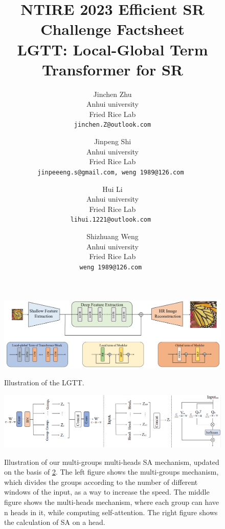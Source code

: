 \documentclass[10pt,twocolumn,letterpaper]{article}
\begin{document}
\title{NTIRE 2023 Efficient SR Challenge Factsheet \\
	LGTT: Local-Global Term Transformer for SR}

\author{Jinchen Zhu\\
Anhui university\\
Fried Rice Lab\\
{\tt\small jinchen.Z@outlook.com}
\and
Jinpeng Shi\\
Anhui university\\
Fried Rice Lab\\
{\tt\small jinpeeeng.s@gmail.com, weng 1989@126.com }
\and 
Hui Li\\
Anhui university\\
Fried Rice Lab\\
{\tt\small lihui.1221@outlook.com }
\and
Shizhuang Weng\\
Anhui university\\
Fried Rice Lab\\
{\tt\small weng 1989@126.com }
}
\maketitle

\begin{figure}[htp]
	\centering
	\centering
	\includegraphics[width=1\linewidth]{Image/Arch}
	\label{trans_sparse}%
	\caption{Illustration of the LGTT.
	}
	\label{arch}
\end{figure}
\begin{figure}[htp]
	\centering
	\centering
	\includegraphics[width=1\linewidth]{Image/multi_sa}
	\label{trans_sparse}%
	\caption {Illustration of our multi-groups multi-heads SA mechanism, updated on the basis of \ref{GMSA}. The left figure shows
	the multi-groups mechanism, which divides the groups according to the number of different windows of the input, as a way
	to increase the speed. The middle figure shows the multi-heads mechanism, where each group can have n heads in it, while
	computing self-attention. The right figure shows the calculation of SA on a head.
	}
	\label{GMSA}
\end{figure}
\end{document}
